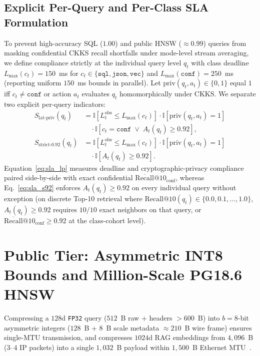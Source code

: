 \documentclass[10pt,journal,compsoc]{IEEEtran}
\begin{document}
\subsection{Explicit Per-Query and Per-Class SLA Formulation}
To prevent high-accuracy SQL ($1.00$) and public HNSW ($\approx 0.99$) queries from masking confidential CKKS recall shortfalls under mode-level stream averaging, we define compliance strictly at the individual query level $q_t$ with class deadline $L_{\max}(c_t) = 150$~ms for $c_t \in \{\texttt{sql},\texttt{json},\texttt{vec}\}$ and $L_{\max}(\texttt{conf}) = 250$~ms (reporting uniform $150$~ms bounds in parallel). Let $\mathrm{priv}(q_t, a_t) \in \{0,1\}$ equal $1$ iff $c_t \neq \texttt{conf}$ or action $a_t$ evaluates $q_t$ homomorphically under CKKS. We separate two explicit per-query indicators:
\begin{align}
S_{\text{lat-priv}}(q_t) &= \mathbb{I}\!\left[L_t^{\text{obs}} \le L_{\max}(c_t)\right] \cdot \mathbb{I}\!\left[\mathrm{priv}(q_t,a_t)=1\right] \nonumber\\
&\quad \cdot \mathbb{I}\!\left[c_t = \texttt{conf} \;\lor\; A_t(q_t) \ge 0.92\right], \label{eq:sla_lp}\\
S_{\text{strict-0.92}}(q_t) &= \mathbb{I}\!\left[L_t^{\text{obs}} \le L_{\max}(c_t)\right] \cdot \mathbb{I}\!\left[\mathrm{priv}(q_t,a_t)=1\right] \nonumber\\
&\quad \cdot \mathbb{I}\!\left[A_t(q_t) \ge 0.92\right]. \label{eq:sla_s92}
\end{align}
Equation~\eqref{eq:sla_lp} measures deadline and cryptographic-privacy compliance paired side-by-side with exact confidential $\overline{\mathrm{Recall}}@10_{\text{conf}}$, whereas Eq.~\eqref{eq:sla_s92} enforces $A_t(q_t) \ge 0.92$ on every individual query without exception (on discrete Top-10 retrieval where $\mathrm{Recall}@10(q_t) \in \{0.0, 0.1, \dots, 1.0\}$, $A_t(q_t) \ge 0.92$ requires $10/10$ exact neighbors on that query, or $\overline{\mathrm{Recall}}@10_{\text{conf}} \ge 0.92$ at the class-cohort level).


\section{Public Tier: Asymmetric INT8 Bounds and Million-Scale PG18.6 HNSW}\label{sec:public}

Compressing a $128$d \texttt{FP32} query ($512$~B raw + headers $> 600$~B) into $b=8$-bit asymmetric integers ($128$~B + $8$~B scale metadata $\approx 210$~B wire frame) ensures single-MTU transmission, and compresses $1024$d RAG embeddings from $4{,}096$~B ($3\text{--}4$ IP packets) into a single $1{,}032$~B payload within $1{,}500$~B Ethernet MTU~\cite{gupta2015stochastic,jacob2018quantization}.
\end{document}
